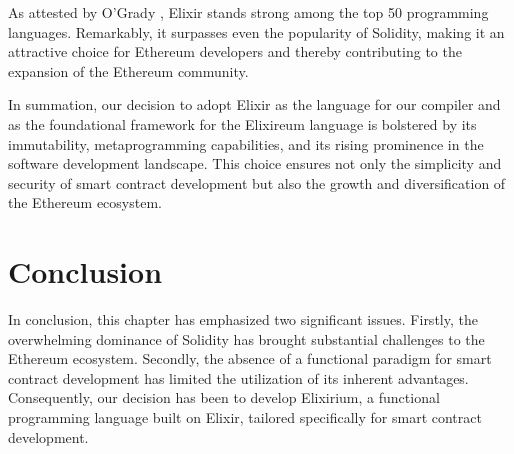 As attested by O'Grady \cite{RedMonk}, Elixir stands strong among the top 50 programming languages. Remarkably, it surpasses even the popularity of Solidity, making it an attractive choice for Ethereum developers and thereby contributing to the expansion of the Ethereum community.

In summation, our decision to adopt Elixir as the language for our compiler and as the foundational framework for the Elixireum language is bolstered by its immutability, metaprogramming capabilities, and its rising prominence in the software development landscape. This choice ensures not only the simplicity and security of smart contract development but also the growth and diversification of the Ethereum ecosystem.

\section{Conclusion}
\label{sec:conc}

In conclusion, this chapter has emphasized two significant issues. Firstly, the overwhelming dominance of Solidity has brought substantial challenges to the Ethereum ecosystem. Secondly, the absence of a functional paradigm for smart contract development has limited the utilization of its inherent advantages. Consequently, our decision has been to develop Elixirium, a functional programming language built on Elixir, tailored specifically for smart contract development.
